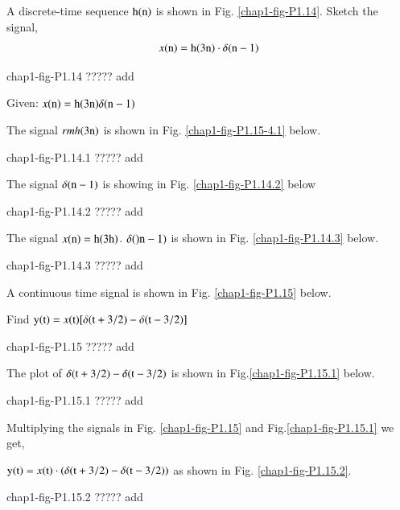 \begin{example}
A discrete-time sequence $\textrm{h}(\textrm{n})$ is shown in Fig. \ref{chap1-fig-P1.14}. Sketch the signal,
$$
x{(\textrm{n})} = \textrm{h}(3\textrm{n})\cdot \delta(\textrm{n}-1)
$$
\begin{center}
chap1-fig-P1.14 ????? add
\end{center}
\end{example}

\begin{solution}
Given: $x(\textrm{n})= \textrm{h}(3\textrm{n}) \delta(\textrm{n}-1)$

The signal $rmh(3 \textrm{n})$ is shown in Fig. \ref{chap1-fig-P1.15-4.1} below.
\begin{center}
chap1-fig-P1.14.1 ????? add
\end{center}


The signal $\delta(\textrm{n}-1)$ is showing in Fig. \ref{chap1-fig-P1.14.2} below
\begin{center}
chap1-fig-P1.14.2 ????? add
\end{center}

The signal $x(\textrm{n})=\textrm{h}(3\textrm{h})$. $\delta()\textrm{n}-1)$ is shown in Fig. \ref{chap1-fig-P1.14.3} below.
\begin{center}
chap1-fig-P1.14.3 ????? add
\end{center} 
\end{solution}

\begin{example}\label{chap1-example-1.15}
A continuous time signal is shown in Fig. \ref{chap1-fig-P1.15} below.

Find ${\textrm{y}(\textrm{t})} = x{(\textrm{t})}[\delta(\textrm{t} + 3/2) -\delta(\textrm{t}-3/2)]$
\begin{center}
chap1-fig-P1.15 ????? add
\end{center} 
\end{example}

\begin{solution}
The plot of $\delta(\textrm{t} + 3/2)-\delta(\textrm{t}-3/2)$ is shown in Fig.\ref{chap1-fig-P1.15.1} below.
\begin{center}
chap1-fig-P1.15.1 ????? add
\end{center} 

Multiplying the signals in  Fig. \ref{chap1-fig-P1.15} and Fig.\ref{chap1-fig-P1.15.1} we get,

${\textrm{y}(\textrm{t})} = x(\textrm{t})\cdot(\delta(\textrm{t} + 3/2) -\delta(\textrm{t} -3/2))$ as shown in Fig. \ref{chap1-fig-P1.15.2}.
\begin{center}
chap1-fig-P1.15.2 ????? add
\end{center}
\end{solution}

